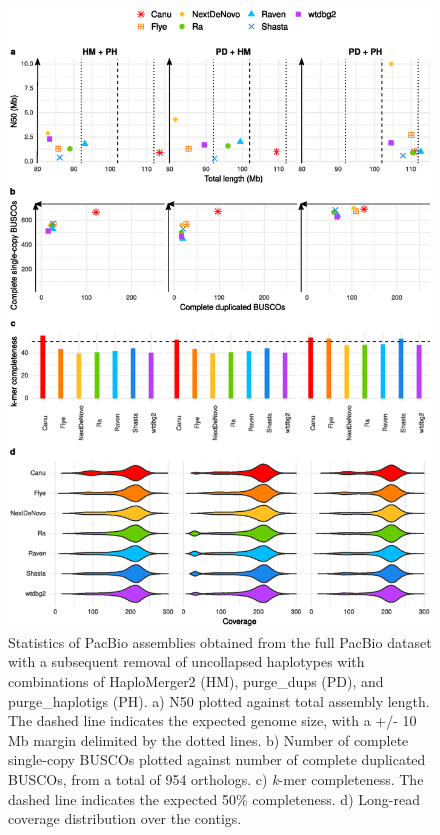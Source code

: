    \begin{figure}[ht]
    \centering
     \includegraphics[width=13.5cm]{fig/benchmark/supp_pacbio_purging_combinations_v20200919.eps}
   \caption{Statistics of PacBio assemblies obtained from the full PacBio dataset with a subsequent removal of uncollapsed haplotypes with combinations of HaploMerger2 (HM), purge\_dups (PD), and purge\_haplotigs (PH). a) N50 plotted against total assembly length. The dashed line indicates the expected genome size, with a +/- 10 Mb margin delimited by the dotted lines. b) Number of complete single-copy BUSCOs plotted against number of complete duplicated BUSCOs, from a total of 954 orthologs. c) \textit{k}-mer completeness. The dashed line indicates the expected 50\% completeness. d) Long-read coverage distribution over the contigs.}
   \label{fig:pacbio_purging_combinations}
 \end{figure}
 
